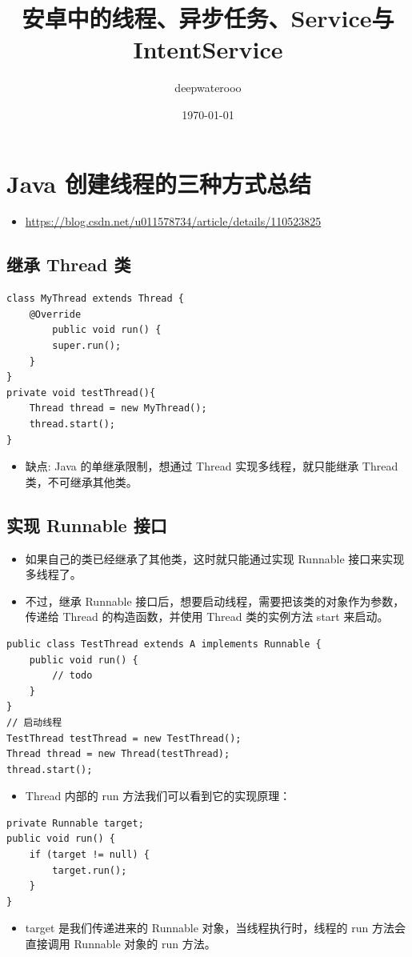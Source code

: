 \documentclass[9pt, b5paper]{article}
\author{deepwaterooo}
\date{\today}
\title{安卓中的线程、异步任务、Service与IntentService}
\begin{document}
\maketitle
\tableofcontents


\section{Java 创建线程的三种方式总结}
\label{sec-1}
\begin{itemize}
\item \url{https://blog.csdn.net/u011578734/article/details/110523825}
\end{itemize}
\subsection{继承 Thread 类}
\label{sec-1-1}
\begin{verbatim}
class MyThread extends Thread {
    @Override
        public void run() {
        super.run();
    }
}
private void testThread(){
    Thread thread = new MyThread();
    thread.start();
}
\end{verbatim}
\begin{itemize}
\item 缺点: Java 的单继承限制，想通过 Thread 实现多线程，就只能继承 Thread 类，不可继承其他类。
\end{itemize}
\subsection{实现 Runnable 接口}
\label{sec-1-2}
\begin{itemize}
\item 如果自己的类已经继承了其他类，这时就只能通过实现 Runnable 接口来实现多线程了。
\item 不过，继承 Runnable 接口后，想要启动线程，需要把该类的对象作为参数，传递给 Thread 的构造函数，并使用 Thread 类的实例方法 start 来启动。
\end{itemize}
\begin{verbatim}
public class TestThread extends A implements Runnable {
    public void run() {
        // todo
    }
}
// 启动线程
TestThread testThread = new TestThread();
Thread thread = new Thread(testThread);
thread.start();
\end{verbatim}
\begin{itemize}
\item Thread 内部的 run 方法我们可以看到它的实现原理：
\end{itemize}
\begin{verbatim}
private Runnable target;
public void run() {
    if (target != null) {
        target.run();
    }
}
\end{verbatim}
\begin{itemize}
\item target 是我们传递进来的 Runnable 对象，当线程执行时，线程的 run 方法会直接调用 Runnable 对象的 run 方法。
\end{itemize}
\end{document}

